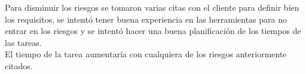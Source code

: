 Para disminuir los riesgos se tomaron varias citas con el cliente para definir bien los requisitos, se intentó tener buena experiencia en las herramientas para no entrar en los riesgos y se intentó hacer una buena planificación de los tiempos de las tareas.\\
El tiempo de la tarea aumentaría con cualquiera de los riesgos anteriormente citados.
